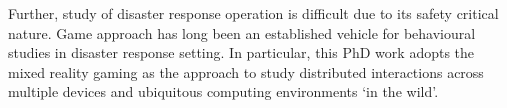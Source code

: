 Further, study of disaster response operation is difficult due to its safety critical nature. Game approach has long been an established vehicle for behavioural studies in disaster response setting. In particular, this PhD work adopts the mixed reality gaming as the  approach to study distributed interactions across multiple devices and ubiquitous computing environments `in the wild'. \\


